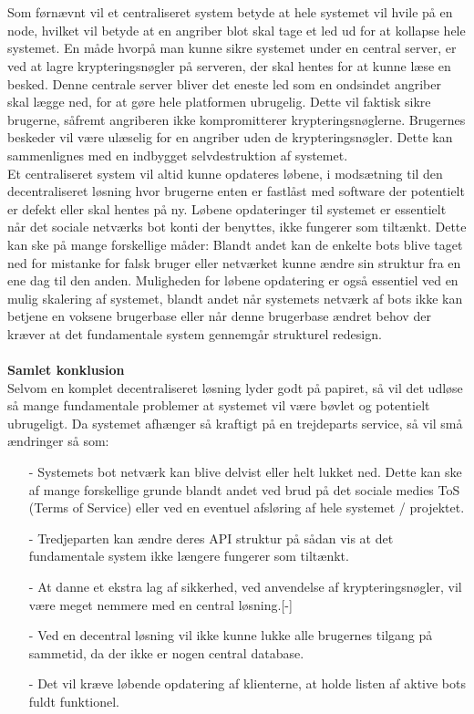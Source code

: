 \\\\
Som førnævnt vil et centraliseret system betyde at hele systemet vil hvile på en node, hvilket vil betyde at en angriber blot skal tage et led ud for at kollapse hele systemet. En måde hvorpå man kunne sikre systemet under en central server, er ved at lagre krypteringsnøgler på serveren, der skal hentes for at kunne læse en besked. Denne centrale server bliver det eneste led som en ondsindet angriber skal lægge ned, for at gøre hele platformen ubrugelig. Dette vil faktisk sikre brugerne, såfremt angriberen ikke kompromitterer krypteringsnøglerne. Brugernes beskeder vil være ulæselig for en angriber uden de krypteringsnøgler. Dette kan sammenlignes med en indbygget selvdestruktion af systemet.\\
Et centraliseret system vil altid kunne opdateres løbene, i modsætning til den decentraliseret løsning hvor brugerne enten er fastlåst med software der potentielt er defekt eller skal hentes på ny. Løbene opdateringer til systemet er essentielt når det sociale netværks bot konti der benyttes, ikke fungerer som tiltænkt. Dette kan ske på mange forskellige måder: Blandt andet kan de enkelte bots blive taget ned for mistanke for falsk bruger eller netværket kunne ændre sin struktur fra en ene dag til den anden. Muligheden for løbene opdatering er også essentiel ved en mulig skalering af systemet, blandt andet når systemets netværk af bots ikke kan betjene en voksene brugerbase eller når denne brugerbase ændret behov der kræver at det fundamentale system gennemgår strukturel redesign.
\\\\
\textbf{Samlet konklusion}\\
Selvom en komplet decentraliseret løsning lyder godt på papiret, så vil det udløse så mange fundamentale problemer at systemet vil være bøvlet og potentielt ubrugeligt. Da systemet afhænger så kraftigt på en trejdeparts service, så vil små ændringer så som:
\begin{itemize}
    \item[-] Systemets bot netværk kan blive delvist eller helt lukket ned. Dette kan ske af mange forskellige grunde blandt andet ved brud på det sociale medies ToS (Terms of Service) eller ved en eventuel afsløring af hele systemet / projektet. 
    \item[-] Tredjeparten kan ændre deres API struktur på sådan vis at det fundamentale system ikke længere fungerer som tiltænkt.
    \item[-] At danne et ekstra lag af sikkerhed, ved anvendelse af krypteringsnøgler, vil være meget nemmere med en central løsning.[-] 
    \item[-] Ved en decentral løsning vil ikke kunne lukke alle brugernes tilgang på sammetid, da der ikke er nogen central database.
    \item[-] Det vil kræve løbende opdatering af klienterne, at holde listen af aktive bots fuldt funktionel.
\end{itemize}

